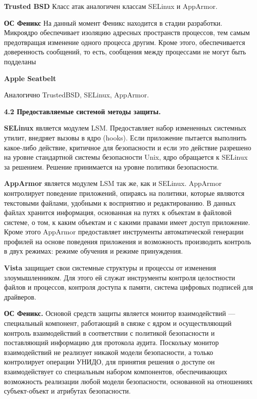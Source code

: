 \bigskip
{\bfseries Trusted BSD} 
Класс атак аналогичен классам SELinux и AppArmor. 

\bigskip
{\bfseries ОС Феникс }
На данный момент Феникс находится в стадии разработки. Микроядро обеспечивает изоляцию адресных пространств процессов, тем самым предотвращая изменение одного процесса другим. Кроме этого, обеспечивается доверенность сообщений, то есть, сообщения между процессами не могут быть подделаны 

\bigskip
{\bfseries Apple Seatbelt}

Аналогично TrustedBSD, SELinux, AppArmor.

\bigskip
{\bfseries 4.2 Предоставляемые системой методы защиты.}

\bigskip
{\bfseries SELinux} является модулем LSM. Предоставляет набор измененных системных утилит, внедряет вызовы в ядро (hooks). Если приложение пытается выполнить какое-либо действие, критичное для безопасности и если это действие разрешено на уровне стандартной системы безопасности Unix, ядро обращается к SELinux за решением. Решение принимается на уровне политики безопасности. 

\bigskip
{\bfseries AppArmor} является модулем LSM так же, как и SELinux. AppArmor контролирует поведение приложений, опираясь на политики, которые являются текстовыми файлами, удобными к восприятию и редактированию. В данных файлах хранится информация, основанная на путях к объектам в файловой системе, о том, к каким объектам и с какими правами имеет доступ приложение. Кроме этого AppArmor предоставляет инструменты автоматической генерации профилей на основе поведения приложения и возможность производить контроль в двух режимах: режиме обучения и режиме принуждения. 

\bigskip
{\bfseries Vista} защищает свои системные структуры и процессы от изменения злоумышленником. Для этого ей служат инструменты контроля целостности файлов и процессов, контроля доступа к памяти, система цифровых подписей для драйверов. 

\bigskip
{\bfseries ОС Феникс.} Основой средств защиты является монитор взаимодействий — специальный компонент, работающий в связке с ядром и осуществляющий контроль взаимодействий в соответствии с политикой безопасности и поставляющий информацию для протокола аудита. Поскольку монитор взаимодействий не реализует никакой модели безопасности, а только контролирует операции УНИДО, для принятия решения о доступе он взаимодействует со специальным набором компонентов, обеспечивающих возможность реализации любой модели безопасности, основанной на отношениях субъект-объект и атрибутах безопасности. 

